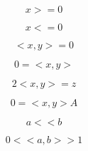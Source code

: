 \documentclass{article}
\begin{document}
\[ x >= 0 \]

\[ x <= 0 \]

\[ <x, y> = 0 \]

\[ 0 = <x,y> \]

\[ 2<x,y> = z \]

\[ 0 = <x,y>A \]

\[ a << b \]

\[ 0 < <a,b> >1 \]
\end{document}
